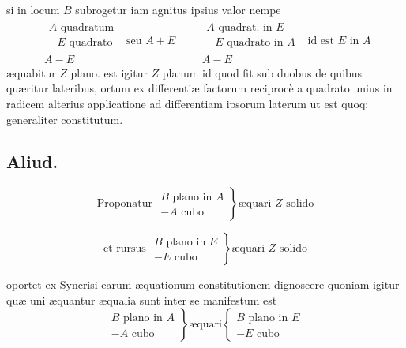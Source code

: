 \documentclass[11pt,a4paper]{article}
\begin{document}
si in locum $B$ subrogetur iam agnitus ipsius valor nempe
\[ \begin{array}{c} \begin{array}{l} A \text{ quadratum} \\ - E \text{ quadrato} \end{array} \\ \hline A - E \end{array} \text{ seu } A + E \qquad \begin{array}{c} \begin{array}{l} A \text{ quadrat. in } E \\ - E \text{ quadrato in } A \end{array} \\ \hline A - E \end{array} \text{ id est } E \text{ in } A \]
æquabitur $Z$ plano. est igitur $Z$ planum id quod fit sub duobus de quibus quæritur lateribus, ortum ex differentiæ factorum reciprocè a quadrato unius in radicem alterius applicatione ad differentiam ipsorum laterum ut est quoq; generaliter constitutum.

\subsection*{Aliud.}

\[ \text{Proponatur } \left.\begin{array}{l} B \text{ plano in } A \\ - A \text{ cubo} \end{array}\right\} \text{æquari } Z \text{ solido} \]

\[ \text{et rursus } \left.\begin{array}{l} B \text{ plano in } E \\ - E \text{ cubo} \end{array}\right\} \text{æquari } Z \text{ solido} \]

oportet ex Syncrisi earum æquationum constitutionem dignoscere quoniam igitur quæ uni æquantur æqualia sunt inter se manifestum est
\[ \left.\begin{array}{l} B \text{ plano in } A \\ - A \text{ cubo} \end{array}\right\} \text{æquari} \left\{\begin{array}{l} B \text{ plano in } E \\ - E \text{ cubo} \end{array}\right. \]
\end{document}
